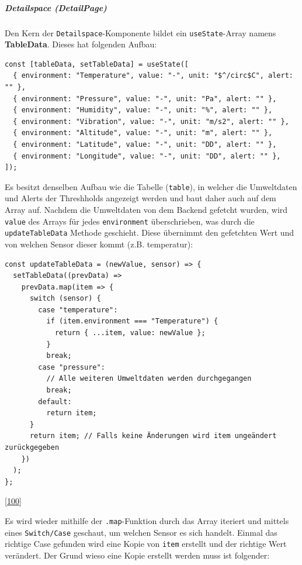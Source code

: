 \documentclass[
    headings=optiontotocandhead,%
    twoside,
    numbers=noenddot,%
    12pt, %
    titlepage, %
    parskip=full, %
    listof=leveldown, 
    numbers=noenddot, %
    a4paper,DIV=14,
    BCOR=15mm,
]{scrbook}
\newcommand{\passthrough}[1]{#1}
\begin{document}
\hypertarget{detailspace-detailpage}{%
\subparagraph{Detailspace (DetailPage)}\label{detailspace-detailpage}}

Den Kern der \passthrough{\lstinline!Detailspace!}-Komponente bildet ein
\passthrough{\lstinline!useState!}-Array namens \textbf{TableData}.
Dieses hat folgenden Aufbau:

\begin{lstlisting}[caption={tableData Array useState}]
const [tableData, setTableData] = useState([
  { environment: "Temperature", value: "-", unit: "$^/circ$C", alert: "" },
  { environment: "Pressure", value: "-", unit: "Pa", alert: "" },
  { environment: "Humidity", value: "-", unit: "%", alert: "" },
  { environment: "Vibration", value: "-", unit: "m/s2", alert: "" },
  { environment: "Altitude", value: "-", unit: "m", alert: "" },
  { environment: "Latitude", value: "-", unit: "DD", alert: "" },
  { environment: "Longitude", value: "-", unit: "DD", alert: "" },
]);
\end{lstlisting}

Es besitzt denselben Aufbau wie die Tabelle
(\passthrough{\lstinline!table!}), in welcher die Umweltdaten und Alerts
der Threshholds angezeigt werden und baut daher auch auf dem Array auf.
Nachdem die Umweltdaten von dem Backend gefetcht wurden, wird
\passthrough{\lstinline!value!} des Arrays für jedes
\passthrough{\lstinline!environment!} überschrieben, was durch die
\passthrough{\lstinline!updateTableData!} Methode geschieht. Diese
übernimmt den gefetchten Wert und von welchen Sensor dieser kommt (z.B.
temperatur):

\begin{lstlisting}[caption={updateTableData Methode}]
const updateTableData = (newValue, sensor) => {
  setTableData((prevData) =>
    prevData.map(item => {
      switch (sensor) {
        case "temperature":
          if (item.environment === "Temperature") {
            return { ...item, value: newValue };
          }
          break;
        case "pressure":
          // Alle weiteren Umweltdaten werden durchgegangen
          break;
        default:
          return item;
      }
      return item; // Falls keine Änderungen wird item ungeändert zurückgegeben
    })
  );
};
\end{lstlisting}

{[}\protect\hyperlink{ref-gpt-updateTableData}{100}{]}

Es wird wieder mithilfe der \passthrough{\lstinline!.map!}-Funktion
durch das Array iteriert und mittels eines
\passthrough{\lstinline!Switch/Case!} geschaut, um welchen Sensor es
sich handelt. Einmal das richtige Case gefunden wird eine Kopie von
\passthrough{\lstinline!item!} erstellt und der richtige Wert verändert.
Der Grund wieso eine Kopie erstellt werden muss ist folgender:
\end{document}

